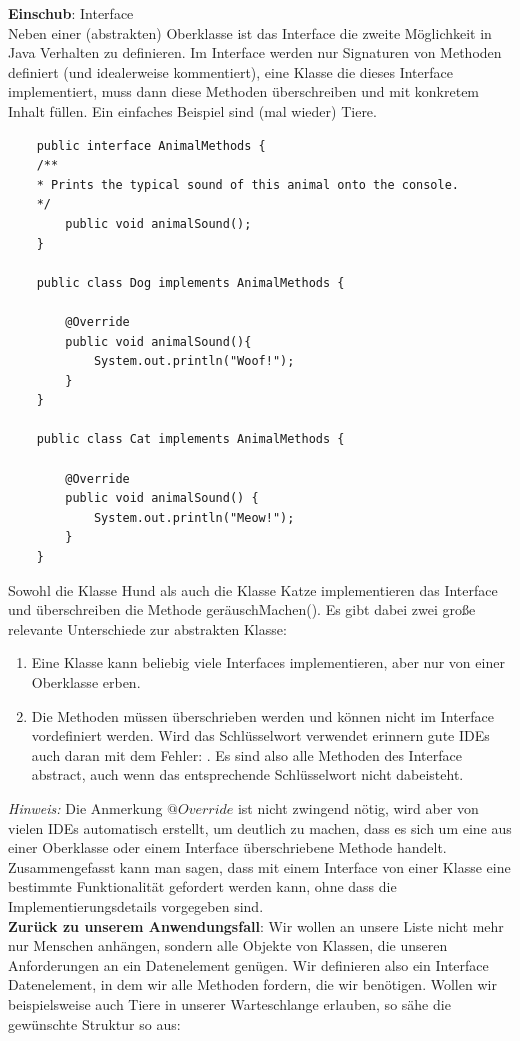 \documentclass{article}
\begin{document}
\textbf{Einschub}: Interface \\
Neben einer (abstrakten) Oberklasse ist das Interface die zweite Möglichkeit in Java  Verhalten zu definieren. Im Interface werden nur Signaturen von Methoden definiert (und idealerweise kommentiert), eine Klasse die dieses Interface implementiert, muss dann diese Methoden überschreiben und mit konkretem Inhalt füllen. Ein einfaches Beispiel sind (mal wieder) Tiere. \\
\begin{verbatim}
    public interface AnimalMethods {
    /** 
    * Prints the typical sound of this animal onto the console.
    */
        public void animalSound();
    }

    public class Dog implements AnimalMethods {

        @Override 
        public void animalSound(){
            System.out.println("Woof!");
        }
    }

    public class Cat implements AnimalMethods {

        @Override 
        public void animalSound() {
            System.out.println("Meow!");
        }
    }
\end{verbatim}
Sowohl die Klasse Hund als auch die Klasse Katze implementieren das Interface und überschreiben die Methode geräuschMachen(). Es gibt dabei zwei große relevante Unterschiede zur abstrakten Klasse:
\begin{enumerate}
    \item Eine Klasse kann beliebig viele Interfaces implementieren, aber nur von einer Oberklasse erben. 
    \item Die Methoden müssen überschrieben werden und können nicht im Interface vordefiniert werden. Wird das Schlüsselwort  verwendet erinnern gute IDEs auch daran mit dem Fehler: . Es sind also alle Methoden des Interface abstract, auch wenn das entsprechende Schlüsselwort nicht dabeisteht.
\end{enumerate}
\textit{Hinweis:} Die Anmerkung $@Override$ ist nicht zwingend nötig, wird aber von vielen IDEs automatisch erstellt, um deutlich zu machen, dass es sich um eine aus einer Oberklasse oder einem Interface überschriebene Methode handelt. \\
Zusammengefasst kann man sagen, dass mit einem Interface von einer Klasse eine bestimmte Funktionalität gefordert werden kann, ohne dass die Implementierungsdetails vorgegeben sind. \\
\textbf{Zurück zu unserem Anwendungsfall}: Wir wollen an unsere Liste nicht mehr nur Menschen anhängen, sondern alle Objekte von Klassen, die unseren Anforderungen an ein Datenelement genügen. Wir definieren also ein Interface Datenelement, in dem wir alle Methoden fordern, die wir benötigen. Wollen wir beispielsweise auch Tiere in unserer Warteschlange erlauben, so sähe die gewünschte Struktur so aus: 
\end{document}
